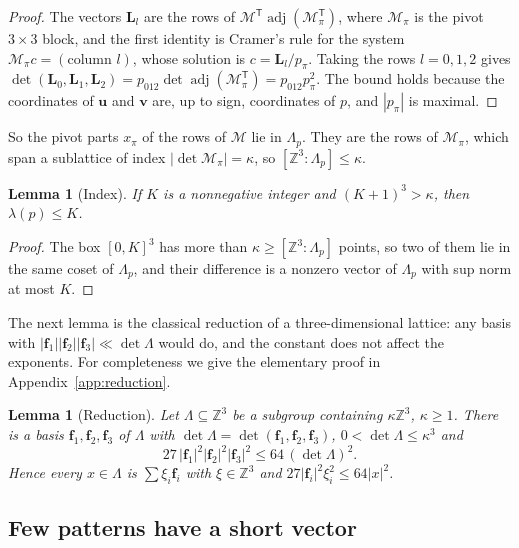 \documentclass[11pt]{article}
\newtheorem{lemma}[theorem]{Lemma}
\theoremstyle{definition}
\theoremstyle{remark}
\begin{document}
\begin{proof}
The vectors $\mathbf L_l$ are the rows of $\mathcal M^{\mathsf T}\operatorname{adj}(\mathcal M_\pi^{\mathsf T})$,
where $\mathcal M_\pi$ is the pivot $3\times3$ block, and the first identity is Cramer's rule
for the system $\mathcal M_\pi c=(\text{column }l)$, whose solution is
$c=\mathbf L_l/p_\pi$. Taking the rows $l=0,1,2$ gives
$\det(\mathbf L_0,\mathbf L_1,\mathbf L_2)=p_{012}\det\operatorname{adj}(\mathcal M_\pi^{\mathsf T})=p_{012}p_\pi^2$. The
bound holds because the coordinates of $\mathbf u$ and $\mathbf v$ are, up to sign, coordinates
of $p$, and $|p_\pi|$ is maximal.
\end{proof}

So the pivot parts $x_\pi$ of the rows of $\mathcal M$ lie in $\Lambda_p$. They are the rows of
$\mathcal M_\pi$, which span a sublattice of index $|\det\mathcal M_\pi|=\kappa$, so
$[\mathbb Z^3:\Lambda_p]\le\kappa$.

\begin{lemma}[Index]\label{lem:index}
If $K$ is a nonnegative integer and $(K+1)^3>\kappa$, then $\lambda(p)\le K$.
\end{lemma}

\begin{proof}
The box $[0,K]^3$ has more than $\kappa\ge[\mathbb Z^3:\Lambda_p]$ points, so two of them lie in
the same coset of $\Lambda_p$, and their difference is a nonzero vector of $\Lambda_p$ with sup
norm at most $K$.
\end{proof}

The next lemma is the classical reduction of a three-dimensional lattice: any
basis with $|\mathbf f_1||\mathbf f_2||\mathbf f_3|\ll\det\Lambda$ would do, and the constant does
not affect the exponents. For completeness we give the elementary proof in
Appendix~\ref{app:reduction}.

\begin{lemma}[Reduction]\label{lem:reduce}
Let $\Lambda\subseteq\mathbb Z^3$ be a subgroup containing $\kappa\mathbb Z^3$, $\kappa\ge1$.
There is a basis $\mathbf f_1,\mathbf f_2,\mathbf f_3$ of $\Lambda$ with $\det\Lambda=\det(\mathbf f_1,\mathbf f_2,\mathbf f_3)$,
$0<\det\Lambda\le\kappa^3$ and
\[
27\,|\mathbf f_1|^2|\mathbf f_2|^2|\mathbf f_3|^2\le64\,(\det\Lambda)^2 .
\]
Hence every $x\in\Lambda$ is $\sum\xi_i\mathbf f_i$ with $\xi\in\mathbb Z^3$ and
$27|\mathbf f_i|^2\xi_i^2\le64|x|^2$.
\end{lemma}

\subsection{Few patterns have a short vector}\label{sec:latticeshort}
\end{document}
